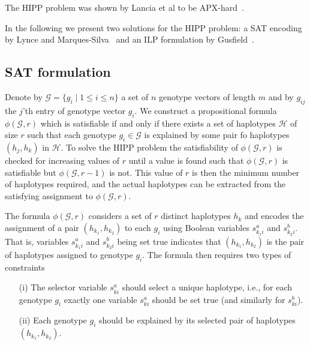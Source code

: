 \documentclass[12pt,a4paper]{article}
\begin{document}
The HIPP problem was shown by Lancia et al to be APX-hard~\cite{DBLP:journals/informs/LanciaPR04}.

In the following we present two solutions for the HIPP problem: a SAT encoding by Lynce and Marques-Silva~\cite{DBLP:conf/aaai/LynceM06} and an ILP formulation by Gusfield~\cite{DBLP:conf/cpm/Gusfield03}.

\subsection{SAT formulation}

Denote by $\mathcal{G}=\{g_i\mid 1\leq i \leq n\}$ a set of $n$ genotype vectors of length $m$ and by $g_{ij}$ the $j$'th entry of genotype vector $g_i$.
We construct a propositional formula $\phi (\mathcal{G}, r)$ which is satisfiable if and only if there exists a set of haplotypes $\mathcal{H}$ of size $r$ such that each genotype $g_i\in \mathcal{G}$ is explained by some pair fo haplotypes $(h_j, h_k)$ in $\mathcal{H}$.
To solve the HIPP problem the satisfiability of $\phi (\mathcal{G}, r)$ is checked for increasing values of $r$ until a value is found such that $\phi (\mathcal{G}, r)$ is satisfiable but $\phi (\mathcal{G}, r-1)$ is not.
This value of $r$ is then the minimum number of haplotypes required, and the actual haplotypes can be extracted from the satisfying assignment to $\phi (\mathcal{G}, r)$.

The formula $\phi (\mathcal{G}, r)$ considers a set of $r$ distinct haplotypes $h_k$ and encodes the assignment of a pair $(h_{k_1}, h_{k_2})$ to each $g_i$ using Boolean variables $s^a_{k_1i}$ and $s^b_{k_2i}$.
That is, variables $s^a_{k_1i}$ and $s^b_{k_2i}$ being set true indicates that $(h_{k_1}, h_{k_2})$ is the pair of haplotypes assigned to genotype $g_i$.
The formula then requires two types of constraints
\begin{enumerate}
\item[(i)] The selector variable $s^a_{ki}$ should select a unique haplotype, i.e., for each genotype $g_i$ exactly one variable $s^a_{ki}$ should be set true (and similarly for $s^b_{ki}$). 
\item[(ii)] Each genotype $g_i$ should be explained by its selected pair of haplotypes $(h_{k_1}, h_{k_2})$. 
\end{enumerate}
\end{document}
